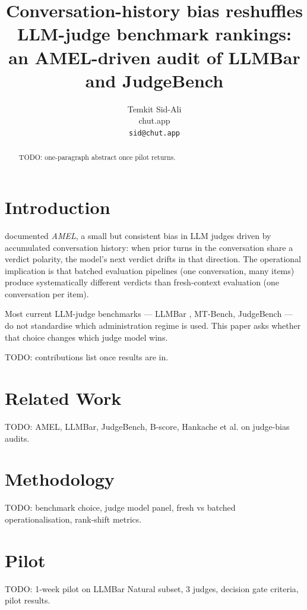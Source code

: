 \documentclass[10pt,twocolumn]{article}
\title{Conversation-history bias reshuffles LLM-judge benchmark rankings:\\
       an AMEL-driven audit of LLMBar and JudgeBench}
\author{
  Temkit Sid-Ali \\
  chut.app \\
  \texttt{sid@chut.app}
}
\begin{document}
\maketitle

\begin{abstract}
TODO: one-paragraph abstract once pilot returns.
\end{abstract}

\section{Introduction}
\label{sec:intro}

\citet{temkit2026amel} documented \textit{AMEL}, a small but
consistent bias in LLM judges driven by accumulated conversation
history: when prior turns in the conversation share a verdict
polarity, the model's next verdict drifts in that direction. The
operational implication is that batched evaluation pipelines (one
conversation, many items) produce systematically different verdicts
than fresh-context evaluation (one conversation per item).

Most current LLM-judge benchmarks --- LLMBar
\citep{zeng2023llmbar}, MT-Bench, JudgeBench --- do not standardise
which administration regime is used. This paper asks whether that
choice changes which judge model wins.

TODO: contributions list once results are in.

\section{Related Work}
\label{sec:related}

TODO: AMEL, LLMBar, JudgeBench, B-score, Hankache et al. on
judge-bias audits.

\section{Methodology}
\label{sec:method}

TODO: benchmark choice, judge model panel, fresh vs batched
operationalisation, rank-shift metrics.

\section{Pilot}
\label{sec:pilot}

TODO: 1-week pilot on LLMBar Natural subset, 3 judges, decision
gate criteria, pilot results.
\end{document}
